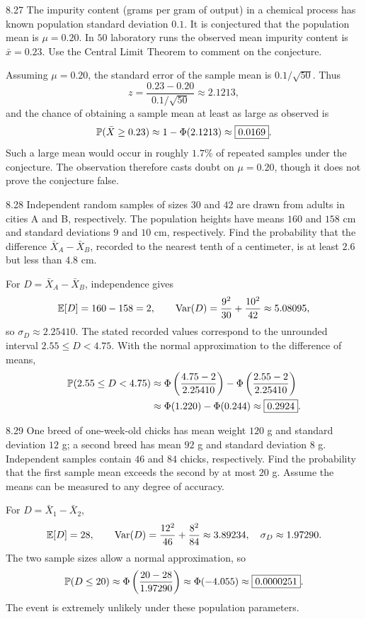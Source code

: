 \documentclass[11pt,oneside]{article}
\begin{document}
\begin{exercise}{8.27}
The impurity content (grams per gram of output) in a chemical process has known population standard deviation $0.1$. It is conjectured that the population mean is $\mu=0.20$. In $50$ laboratory runs the observed mean impurity content is $\bar x=0.23$. Use the Central Limit Theorem to comment on the conjecture.
\end{exercise}
\begin{solution}
Assuming $\mu=0.20$, the standard error of the sample mean is $0.1/\sqrt{50}$. Thus
\[
z=\frac{0.23-0.20}{0.1/\sqrt{50}}\approx2.1213,
\]
and the chance of obtaining a sample mean at least as large as observed is
\[
\mathbb{P}(\bar X\ge0.23)
\approx1-\Phi(2.1213)\approx\boxed{0.0169}.
\]
Such a large mean would occur in roughly $1.7\%$ of repeated samples under the conjecture. The observation therefore casts doubt on $\mu=0.20$, though it does not prove the conjecture false.
\end{solution}

\begin{exercise}{8.28}
Independent random samples of sizes $30$ and $42$ are drawn from adults in cities A and B, respectively. The population heights have means $160$ and $158$ cm and standard deviations $9$ and $10$ cm, respectively. Find the probability that the difference $\bar X_A-\bar X_B$, recorded to the nearest tenth of a centimeter, is at least $2.6$ but less than $4.8$ cm.
\end{exercise}
\begin{solution}
For $D=\bar X_A-\bar X_B$, independence gives
\[
\mathbb{E}[D]=160-158=2, \qquad
\operatorname{Var}(D)=\frac{9^2}{30}+\frac{10^2}{42}\approx5.08095,
\]
so $\sigma_D\approx2.25410$. The stated recorded values correspond to the unrounded interval $2.55\le D<4.75$. With the normal approximation to the difference of means,
\[
\begin{aligned}
\mathbb{P}(2.55\le D<4.75)
&\approx\Phi\left(\frac{4.75-2}{2.25410}\right)
-\Phi\left(\frac{2.55-2}{2.25410}\right)\\
&\approx\Phi(1.220)-\Phi(0.244)\approx\boxed{0.2924}.
\end{aligned}
\]
\end{solution}

\begin{exercise}{8.29}
One breed of one-week-old chicks has mean weight $120$ g and standard deviation $12$ g; a second breed has mean $92$ g and standard deviation $8$ g. Independent samples contain $46$ and $84$ chicks, respectively. Find the probability that the first sample mean exceeds the second by at most $20$ g. Assume the means can be measured to any degree of accuracy.
\end{exercise}
\begin{solution}
For $D=\bar X_1-\bar X_2$,
\[
\mathbb{E}[D]=28, \qquad
\operatorname{Var}(D)=\frac{12^2}{46}+\frac{8^2}{84}\approx3.89234,
\quad\sigma_D\approx1.97290.
\]
The two sample sizes allow a normal approximation, so
\[
\mathbb{P}(D\le20)\approx\Phi\left(\frac{20-28}{1.97290}\right)
\approx\Phi(-4.055)\approx\boxed{0.0000251}.
\]
The event is extremely unlikely under these population parameters.
\end{solution}
\end{document}
